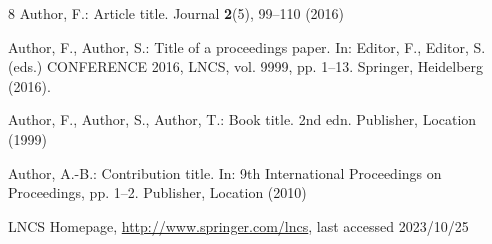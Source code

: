 \documentclass[runningheads]{llncs}
\begin{document}
%
%
%
% 
% 
%
\begin{thebibliography}{8}
Author, F.: Article title. Journal \textbf{2}(5), 99--110 (2016)

Author, F., Author, S.: Title of a proceedings paper. In: Editor,
F., Editor, S. (eds.) CONFERENCE 2016, LNCS, vol. 9999, pp. 1--13.
Springer, Heidelberg (2016). 

Author, F., Author, S., Author, T.: Book title. 2nd edn. Publisher,
Location (1999)

Author, A.-B.: Contribution title. In: 9th International Proceedings
on Proceedings, pp. 1--2. Publisher, Location (2010)

LNCS Homepage, \url{http://www.springer.com/lncs}, last accessed 2023/10/25
\end{thebibliography}
\end{document}
